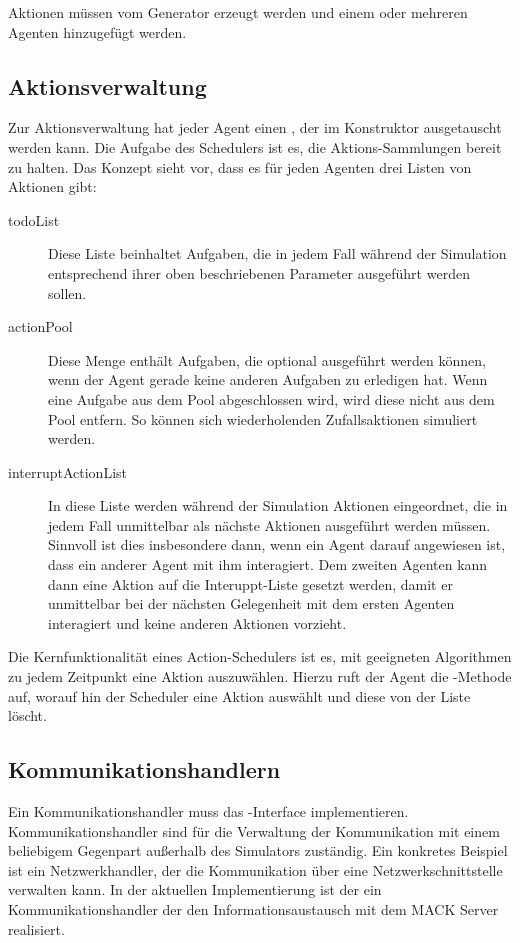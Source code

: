 Aktionen müssen vom Generator erzeugt werden und einem oder mehreren Agenten hinzugefügt werden.

\subsection{Aktionsverwaltung}\label{subsec:concept_actionhandling}
Zur Aktionsverwaltung hat jeder Agent einen , der im Konstruktor ausgetauscht werden kann. Die Aufgabe des Schedulers ist es, die Aktions-Sammlungen bereit zu halten. Das Konzept sieht vor, dass es für jeden Agenten drei Listen von Aktionen gibt:
\begin{description}
	\item[todoList] Diese Liste beinhaltet Aufgaben, die in jedem Fall während der Simulation entsprechend ihrer oben beschriebenen Parameter ausgeführt werden sollen.
	\item[actionPool] Diese Menge enthält Aufgaben, die optional ausgeführt werden können, wenn der Agent gerade keine anderen Aufgaben zu erledigen hat. Wenn eine Aufgabe aus dem Pool abgeschlossen wird, wird diese nicht aus dem Pool entfern. So können sich wiederholenden Zufallsaktionen simuliert werden.
	\item[interruptActionList] In diese Liste werden während der Simulation Aktionen eingeordnet, die in jedem Fall unmittelbar als nächste Aktionen ausgeführt werden müssen. Sinnvoll ist dies insbesondere dann, wenn ein Agent darauf angewiesen ist, dass ein anderer Agent mit ihm interagiert. Dem zweiten Agenten kann dann eine Aktion auf die Interuppt-Liste gesetzt werden, damit er unmittelbar bei der nächsten Gelegenheit mit dem ersten Agenten interagiert und keine anderen Aktionen vorzieht.
\end{description}

Die Kernfunktionalität eines Action-Schedulers ist es, mit geeigneten Algorithmen zu jedem Zeitpunkt eine Aktion auszuwählen. Hierzu ruft der Agent die -Methode auf, worauf hin der Scheduler eine Aktion auswählt und diese von der Liste löscht.


\subsection{Kommunikationshandlern}\label{subsec:concept_communication}
Ein Kommunikationshandler muss das -Interface implementieren. Kommunikationshandler sind für die Verwaltung der Kommunikation mit einem beliebigem Gegenpart außerhalb des Simulators zuständig. Ein konkretes Beispiel ist ein Netzwerkhandler, der die Kommunikation über eine Netzwerkschnittstelle verwalten kann. In der aktuellen Implementierung ist der  ein Kommunikationshandler der den Informationsaustausch mit dem MACK Server realisiert.

